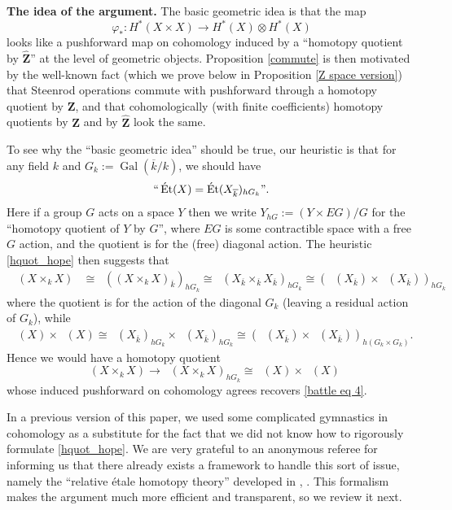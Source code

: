 \documentclass[10pt, reqno]{amsart}
\numberwithin{equation}{subsection}
\newcommand{\Z}{\mathbf{Z}}
\newcommand{\Gal}{\operatorname{Gal}}
\newcommand{\ol}[1]{\overline{#1}}
\newcommand{\wh}[1]{\widehat{#1}}
\newcommand{\co}{\colon}
\DeclareMathOperator{\et}{\acute{e}t}
\DeclareMathOperator{\Et}{\acute{E}t}
\theoremstyle{remark}
\begin{document}
\noindent \textbf{The idea of the argument.} The basic geometric idea is that the map 
\begin{equation}\label{battle eq 4}
\varphi_* \co  H^*_{\et}(X \times X )  \rightarrow H^*_{\et}(X) \otimes H^*_{\et}(X)
\end{equation}
looks like a pushforward map on cohomology induced by a  ``homotopy quotient by $\wh{\Z}$'' at the level of geometric objects. Proposition \ref{commute} is then motivated by the well-known fact (which we prove below in Proposition \ref{Z space version}) that Steenrod operations commute with pushforward through a homotopy quotient by $\Z$, and that cohomologically (with finite coefficients) homotopy quotients by $\Z$ and by $\wh{\Z}$ look the same.

To see why the ``basic geometric idea'' should be true, our heuristic is that for any field $k$ and $G_k := \Gal(\ol{k}/k)$, we should have 
\begin{equation}\label{hquot_hope}
``\Et(X)  = \Et(X_{\ol{k}})_{hG_k}".
\end{equation}
Here if a group $G$ acts on a space $Y$ then we write $Y_{hG} := (Y \times EG)/G$ for the ``homotopy quotient of $Y$ by $G$'', where $EG$ is some contractible space with a free $G$ action, and the quotient is for the (free) diagonal action. The heuristic \eqref{hquot_hope} then suggests that
\begin{align*}
\Et(X \times_{k} X)  &\cong \Et((X \times_{k} X)_{\ol{k}})_{hG_k}  \cong \Et(X_{\ol{k}} \times_{\ol{k}} X_{\ol{k}})_{hG_k}  \cong (\Et(X_{\ol{k}}) \times \Et(X_{\ol{k}}))_{hG_k}
\end{align*}
where the quotient is for the action of the diagonal $G_k$ (leaving a residual action of $G_k$), while 
\begin{align*}
\Et(X) \times \Et(X)  \cong \Et(X_{\ol{k}})_{hG_k} \times \Et(X_{\ol{k}})_{hG_k}  \cong  (\Et(X_{\ol{k}}) \times \Et(X_{\ol{k}}))_{h(G_k \times G_k)}.
\end{align*}
Hence we would have a homotopy quotient
\[
\Et(X \times_{k}X) \rightarrow \Et(X \times_{k}X) _{hG_k} \cong  \Et(X) \times \Et(X)
\]
whose induced pushforward on cohomology agrees recovers \eqref{battle eq 4}. 

In a previous version of this paper, we used some complicated gymnastics in cohomology as a substitute for the fact that we did not know how to rigorously formulate \eqref{hquot_hope}. We are very grateful to an anonymous referee for informing us that there already exists a framework to handle this sort of issue, namely the ``relative \'{e}tale homotopy theory'' developed in \cite{HS}, \cite{BS}. This formalism makes the argument much more efficient and transparent, so we review it next. \\
\end{document}

